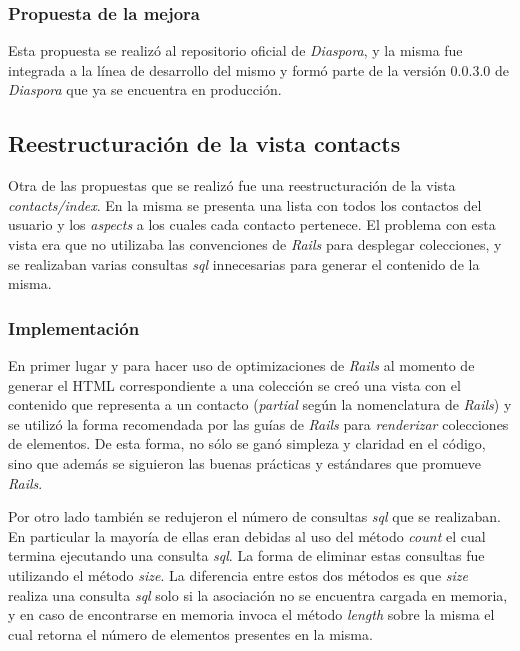 \subsubsection{Propuesta de la mejora}

Esta propuesta se realizó al repositorio oficial de \emph{Diaspora}, y la misma fue integrada a la línea de desarrollo del mismo y formó parte de la versión 0.0.3.0 de \emph{Diaspora} que ya se
encuentra en producción. 

\subsection{Reestructuración de la vista contacts}

Otra de las propuestas que se realizó fue una reestructuración de la vista \emph{contacts/index}. En la misma se presenta una lista con todos los contactos del usuario y los
\emph{aspects} a los cuales cada contacto pertenece. El problema con esta vista era que no utilizaba las convenciones de \emph{Rails} para desplegar colecciones, y se realizaban
varias consultas \emph{sql} innecesarias para generar el contenido de la misma.

\subsubsection{Implementación}

En primer lugar y para hacer uso de optimizaciones de \emph{Rails} al momento de generar el HTML correspondiente a una colección se creó una vista con el contenido que representa a un contacto 
(\emph{partial} según la nomenclatura de \emph{Rails}) y se utilizó la forma recomendada por las guías de \emph{Rails} para \emph{renderizar} colecciones de elementos. De esta 
forma, no sólo se ganó simpleza y claridad en el código, sino que además se siguieron las buenas prácticas y estándares que promueve \emph{Rails}.
 
Por otro lado también se redujeron el número de consultas \emph{sql} que se realizaban. En particular la mayoría de ellas eran debidas al uso del método \emph{count} el cual termina 
ejecutando una consulta \emph{sql}. La forma de eliminar estas consultas fue utilizando el método \emph{size}. La diferencia entre estos dos métodos es que \emph{size} realiza una
consulta \emph{sql} solo si la asociación no se encuentra cargada en memoria, y en caso de encontrarse en memoria invoca el método \emph{length} sobre la misma el cual retorna
el número de elementos presentes en la misma.

